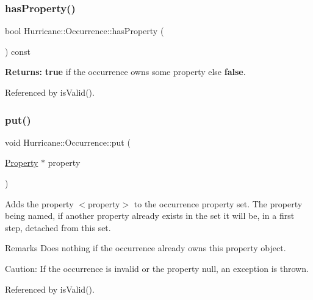 \mbox{\label{classHurricane_1_1Occurrence_a0c1c6cfdf47f33166d108e2311d74e48}} 
\subsubsection{\texorpdfstring{has\+Property()}{hasProperty()}}
{\footnotesize\ttfamily bool Hurricane\+::\+Occurrence\+::has\+Property (\begin{DoxyParamCaption}{ }\end{DoxyParamCaption}) const}

{\bfseries Returns\+:} {\bfseries true} if the occurrence owns some property else {\bfseries false}. 

Referenced by is\+Valid().

\mbox{\label{classHurricane_1_1Occurrence_aaea0bdc4f5bb4012eb52f3abe20525be}} 
\subsubsection{\texorpdfstring{put()}{put()}}
{\footnotesize\ttfamily void Hurricane\+::\+Occurrence\+::put (\begin{DoxyParamCaption}\item[{\hyperlink{classHurricane_1_1Property}{Property} $\ast$}]{property }\end{DoxyParamCaption})}

Adds the property {\ttfamily $<$property$>$} to the occurrence property set. The property being named, if another property already exists in the set it will be, in a first step, detached from this set.

\begin{DoxyRemark}{Remarks}
Does nothing if the occurrence already owns this property object.
\end{DoxyRemark}
\begin{DoxyParagraph}{Caution\+:}
If the occurrence is invalid or the property null, an exception is thrown. 
\end{DoxyParagraph}


Referenced by is\+Valid().

